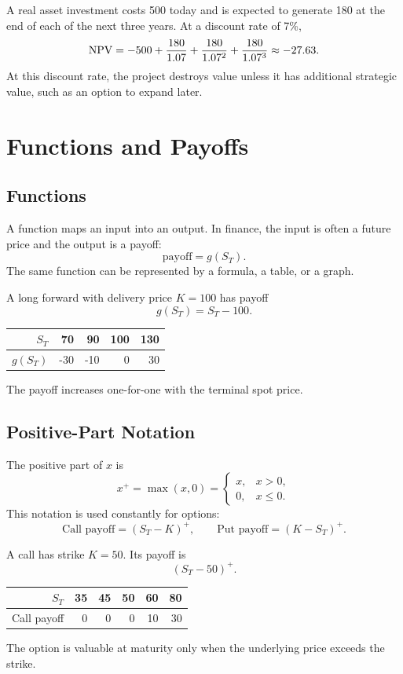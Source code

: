 \begin{exmp}
A real asset investment costs 500 today and is expected to generate 180 at the
end of each of the next three years. At a discount rate of 7\%,
\[
    \mathrm{NPV}=-500+\frac{180}{1.07}+\frac{180}{1.07^2}+\frac{180}{1.07^3}
    \approx -27.63.
\]
At this discount rate, the project destroys value unless it has additional
strategic value, such as an option to expand later.
\end{exmp}

\section{Functions and Payoffs}

\subsection{Functions}

A function maps an input into an output. In finance, the input is often a future
price and the output is a payoff:
\[
    \text{payoff}=g(S_T).
\]
The same function can be represented by a formula, a table, or a graph.

\begin{exmp}
A long forward with delivery price $K=100$ has payoff
\[
    g(S_T)=S_T-100.
\]
\begin{tabular}{@{}rrrrr@{}}
\toprule
$S_T$ & 70 & 90 & 100 & 130 \\
\midrule
$g(S_T)$ & -30 & -10 & 0 & 30 \\
\bottomrule
\end{tabular}
The payoff increases one-for-one with the terminal spot price.
\end{exmp}

\subsection{Positive-Part Notation}

The positive part of $x$ is
\[
    x^+ = \max(x,0)
    =
    \begin{cases}
    x, & x>0,\\
    0, & x\leq 0.
    \end{cases}
\]
This notation is used constantly for options:
\[
    \text{Call payoff}=(S_T-K)^+,
    \qquad
    \text{Put payoff}=(K-S_T)^+.
\]

\begin{exmp}
A call has strike $K=50$. Its payoff is
\[
    (S_T-50)^+.
\]
\begin{tabular}{@{}rrrrrr@{}}
\toprule
$S_T$ & 35 & 45 & 50 & 60 & 80 \\
\midrule
Call payoff & 0 & 0 & 0 & 10 & 30 \\
\bottomrule
\end{tabular}
The option is valuable at maturity only when the underlying price exceeds the
strike.
\end{exmp}

